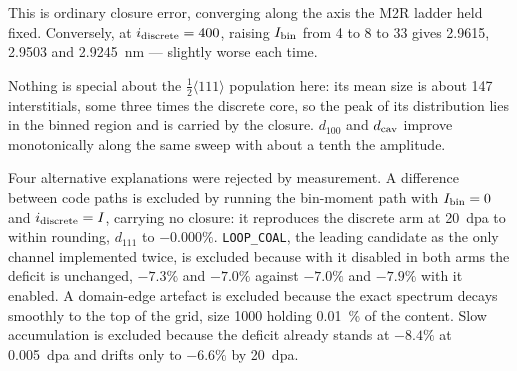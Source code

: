 \documentclass[11pt]{article}
\newcommand{\halfp}{$\tfrac{1}{2}\langle111\rangle$}
\begin{document}
This is ordinary closure error, converging along the axis the M2R ladder held
fixed. Conversely, at $i_{\rm discrete} = 400$, raising $I_{\rm bin}$ from 4 to
8 to 33 gives 2.9615, 2.9503 and \SI{2.9245}{\nano\metre} --- slightly worse
each time.

Nothing is special about the \halfp{} population here: its mean size is about
147 interstitials, some three times the discrete core, so the peak of its
distribution lies in the binned region and is carried by the closure. $d_{100}$
and $d_{\rm cav}$ improve monotonically along the same sweep with about a tenth
the amplitude.

Four alternative explanations were rejected by measurement. A difference between
code paths is excluded by running the bin-moment path with $I_{\rm bin} = 0$ and
$i_{\rm discrete} = I$, carrying no closure: it reproduces the discrete arm at
\SI{20}{dpa} to within rounding, $d_{111}$ to $-0.000\%$. \texttt{LOOP\_COAL},
the leading candidate as the only channel implemented twice, is excluded because
with it disabled in both arms the deficit is unchanged, $-7.3\%$ and $-7.0\%$
against $-7.0\%$ and $-7.9\%$ with it enabled. A domain-edge artefact is
excluded because the exact spectrum decays smoothly to the top of the grid, size
1000 holding \SI{0.01}{\percent} of the content. Slow accumulation is excluded
because the deficit already stands at $-8.4\%$ at \SI{0.005}{dpa} and drifts
only to $-6.6\%$ by \SI{20}{dpa}.
\end{document}
